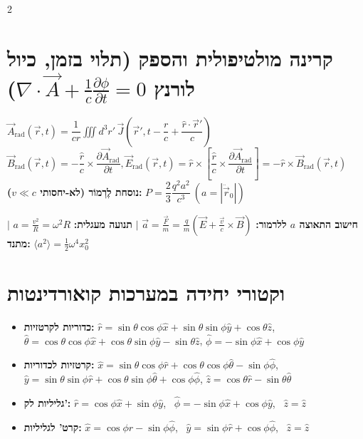 \documentclass[10pt,a4paper]{article}
\begin{document}
\begin{multicols*}{2}
\section*{קרינה מולטיפולית והספק (תלוי בזמן, כיול לורנץ $\nabla \cdot \vec{A} + \frac{1}{c}\frac{\partial \phi}{\partial t} = 0$)}
\noindent
{\small
$
\vec{A}_{\text{rad}}(\vec{r},t) = \dfrac{1}{cr} \iiint d^3r' \, \vec{J}\left(\vec{r}', t - \dfrac{r}{c} + \dfrac{\hat{r} \cdot \vec{r}'}{c}\right)
$
}\\
{\small$
\vec{B}_{\text{rad}}(\vec{r},t) = -\dfrac{\hat{r}}{c} \times \dfrac{\partial \vec{A}_{\text{rad}}}{\partial t},
\vec{E}_{\text{rad}}(\vec{r},t) = \hat{r} \times \left[ \dfrac{\hat{r}}{c} \times \dfrac{\partial \vec{A}_{\text{rad}}}{\partial t} \right] = -\hat{r} \times \vec{B}_{\text{rad}}(\vec{r},t)
$}
\noindent
\textbf{נוסחת לֶרְמוֹר (לא-יחסותי $v \ll c$):}
$P = \dfrac{2}{3} \dfrac{q^2 a^2}{c^3} \ \left(a = |\ddot{\vec{r}}_0|\right)$

\noindent
\textbf{חישוב התאוצה $a$ ללרמור:} $\vec{a} = \frac{\vec{F}}{m} = \frac{q}{m}\left(\vec{E} + \frac{\vec{v}}{c}\times\vec{B}\right)$ \quad $|$ \quad \textbf{תנועה מעגלית:} $a = \frac{v^2}{R} = \omega^2 R$ \quad $|$ \quad \textbf{מתנד:} $\langle a^2 \rangle = \frac{1}{2}\omega^4 x_0^2$

\section{וקטורי יחידה במערכות קואורדינטות}
\begin{itemize}

    \item \textbf{כדוריות לקרטזיות:}
    $\hat{r} = \sin\theta\cos\phi\hat{x} + \sin\theta\sin\phi\hat{y} + \cos\theta\hat{z}$, \quad
    $\hat{\theta} = \cos\theta\cos\phi\hat{x} + \cos\theta\sin\phi\hat{y} - \sin\theta\hat{z}$, \quad
    $\hat{\phi} = -\sin\phi\hat{x} + \cos\phi\hat{y}$
    \item \textbf{קרטזיות לכדוריות:}
    $\hat{x} = \sin\theta\cos\phi\hat{r} + \cos\theta\cos\phi\hat{\theta} - \sin\phi\hat{\phi}$, \quad
    $\hat{y} = \sin\theta\sin\phi\hat{r} + \cos\theta\sin\phi\hat{\theta} + \cos\phi\hat{\phi}$, \quad
    $\hat{z} = \cos\theta\hat{r} - \sin\theta\hat{\theta}$
    \item \textbf{גליליות לק':}
    $\hat{r} = \cos\phi\hat{x} + \sin\phi\hat{y}$, \
    $\hat{\phi} = -\sin\phi\hat{x} + \cos\phi\hat{y}$, \
    $\hat{z} = \hat{z}$
    \item \textbf{קרט' לגליליות:}
    $\hat{x} = \cos\phi\hat{r} - \sin\phi\hat{\phi}$, \
    $\hat{y} = \sin\phi\hat{r} + \cos\phi\hat{\phi}$, \
    $\hat{z} = \hat{z}$


\end{itemize}
\end{multicols*}
\end{document}
